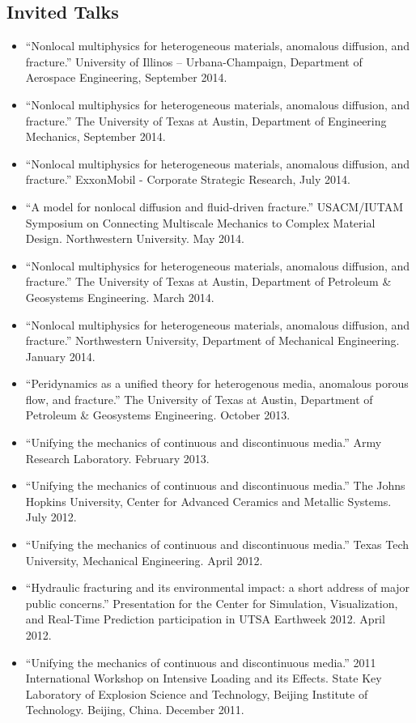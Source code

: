\subsection*{Invited Talks}

\begin{itemize}
    \item ``Nonlocal multiphysics for heterogeneous materials, anomalous diffusion, and fracture.'' University of Illinos -- Urbana-Champaign, Department of Aerospace Engineering, September 2014.
    \item ``Nonlocal multiphysics for heterogeneous materials, anomalous diffusion, and fracture.'' The University of Texas at Austin, Department of Engineering Mechanics, September 2014.
    \item ``Nonlocal multiphysics for heterogeneous materials, anomalous diffusion, and fracture.'' ExxonMobil - Corporate Strategic Research, July 2014.
    \item ``A model for nonlocal diffusion and fluid-driven fracture.'' USACM/IUTAM Symposium on Connecting Multiscale Mechanics to Complex Material Design. Northwestern University. May 2014.
    \item ``Nonlocal multiphysics for heterogeneous materials, anomalous diffusion, and fracture.'' The University of Texas at Austin, Department of Petroleum \& Geosystems Engineering. March 2014.
    \item ``Nonlocal multiphysics for heterogeneous materials, anomalous diffusion, and fracture.'' Northwestern University, Department of Mechanical Engineering. January 2014.
    \item ``Peridynamics as a unified theory for heterogenous media, anomalous porous flow, and fracture.'' The University of Texas at Austin, Department of Petroleum \& Geosystems Engineering. October 2013.
    \item ``Unifying the mechanics of continuous and discontinuous media.''  Army Research Laboratory.  February 2013.
    \item ``Unifying the mechanics of continuous and discontinuous media.''  The Johns Hopkins University, Center for Advanced Ceramics and Metallic Systems.  July 2012.
    \item ``Unifying the mechanics of continuous and discontinuous media.''  Texas Tech University, Mechanical Engineering.  April 2012.
    \item ``Hydraulic fracturing and its environmental impact: a short address of major public concerns.'' Presentation for the Center for Simulation, Visualization, and Real-Time Prediction participation in UTSA Earthweek 2012.  April 2012.
    \item ``Unifying the mechanics of continuous and discontinuous media.''  2011 International Workshop on Intensive Loading and its Effects.  State Key Laboratory of Explosion Science and Technology, Beijing Institute of Technology.  Beijing, China. December 2011.


\end{itemize}
